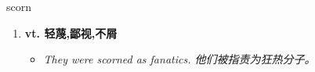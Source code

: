 
\begin{frame}
{\huge scorn}
\begin{center}
\begin{enumerate}\Large
  \item \textbf{vt. 轻蔑,鄙视,不屑}
  \begin{itemize}
    \item \em{\Large{They were scorned as fanatics. 他们被指责为狂热分子。}}
  \end{itemize}
\end{enumerate}
\end{center}
\end{frame}
